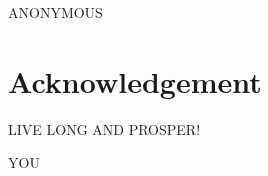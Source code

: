 \newpage

\thispagestyle{empty}
\null\vfill


\parbox{\textwidth}{%
    \centering
    \raggedleft\large\MakeUppercase{Anonymous}\par%
}

\vfill\vfill


\clearpage

\newpage
\newpage

\chapter*{Acknowledgement}

\thispagestyle{empty}
\null\vfill
{\centering
\parbox{0.75\textwidth}{

	\lipsum[1-2]
        \vspace{5mm}

        {\raggedright\MakeUppercase{Live long and prosper!}\par}

        \vspace{10mm}

        {\raggedleft\MakeUppercase{You}\par}


        }\par}

\vfill\vfill
\normalsize
\clearpage

\newpage
